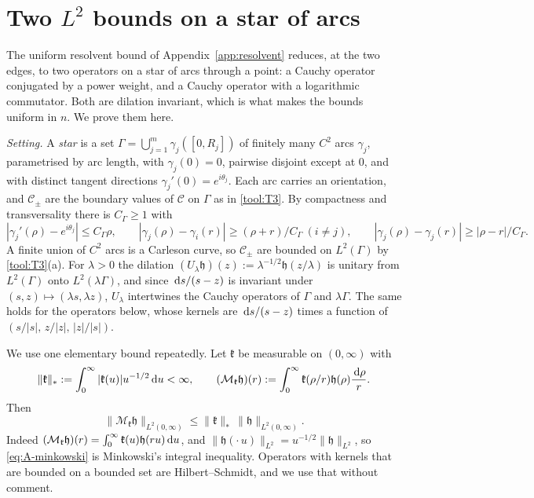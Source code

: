\providecommand{\Cauchy}{\mathcal{C}}

\section{Two \texorpdfstring{$L^2$}{L2} bounds on a star of arcs}\label{app:L2}

The uniform resolvent bound of Appendix~\ref{app:resolvent} reduces, at the two edges, to two operators on a star of
arcs through a point: a Cauchy operator conjugated by a power weight, and a Cauchy operator with a logarithmic
commutator. Both are dilation invariant, which is what makes the bounds uniform in $n$. We prove them here.

\emph{Setting.} A \emph{star} is a set $\Gamma=\bigcup_{j=1}^m\gamma_j([0,R_j])$ of finitely many $C^2$ arcs
$\gamma_j$, parametrised by arc length, with $\gamma_j(0)=0$, pairwise disjoint except at $0$, and with distinct
tangent directions $\gamma_j'(0)=e^{i\theta_j}$. Each arc carries an orientation, and $\Cauchy_\pm$ are the boundary
values of $\Cauchy$ on $\Gamma$ as in \ref{tool:T3}. By compactness and transversality there is $C_\Gamma\ge1$ with
\begin{equation}\label{eq:A-geom}
  |\gamma_j'(\rho)-e^{i\theta_j}|\le C_\Gamma\rho,\qquad |\gamma_j(\rho)-\gamma_i(r)|\ge(\rho+r)/C_\Gamma\ (i\ne j),\qquad
  |\gamma_j(\rho)-\gamma_j(r)|\ge|\rho-r|/C_\Gamma .
\end{equation}
A finite union of $C^2$ arcs is a Carleson curve, so $\Cauchy_\pm$ are bounded on $L^2(\Gamma)$ by \ref{tool:T3}(a). For
$\lambda>0$ the dilation $(U_\lambda\mathfrak h)(z):=\lambda^{-1/2}\mathfrak h(z/\lambda)$ is unitary from $L^2(\Gamma)$ onto
$L^2(\lambda\Gamma)$, and since $\,\mathrm{d} s/(s-z)$ is invariant under $(s,z)\mapsto(\lambda s,\lambda z)$, $U_\lambda$
intertwines the Cauchy operators of $\Gamma$ and $\lambda\Gamma$. The same holds for the operators below, whose kernels
are $\,\mathrm{d} s/(s-z)$ times a function of $(s/|s|,\,z/|z|,\,|z|/|s|)$.

We use one elementary bound repeatedly. Let $\mathfrak k$ be measurable on $(0,\infty)$ with
\[
  \|\mathfrak k\|_*:=\int_0^\infty|\mathfrak k(u)|u^{-1/2}\,\mathrm{d} u<\infty,\qquad
  (\mathcal M_{\mathfrak k}\mathfrak h)(r):=\int_0^\infty\mathfrak k(\rho/r)\mathfrak h(\rho)\frac{\,\mathrm{d}\rho}r .
\]
Then
\begin{equation}\label{eq:A-minkowski}
  \|\mathcal M_{\mathfrak k}\mathfrak h\|_{L^2(0,\infty)}\le\|\mathfrak k\|_*\,\|\mathfrak h\|_{L^2(0,\infty)} .
\end{equation}
Indeed $(\mathcal M_{\mathfrak k}\mathfrak h)(r)=\int_0^\infty\mathfrak k(u)\mathfrak h(ru)\,\mathrm{d} u$, and $\|\mathfrak h(\cdot\,u)\|_{L^2}=u^{-1/2}
\|\mathfrak h\|_{L^2}$, so \eqref{eq:A-minkowski} is Minkowski's integral inequality. Operators
with kernels that are bounded on a bounded set are Hilbert--Schmidt, and we use that without comment.

